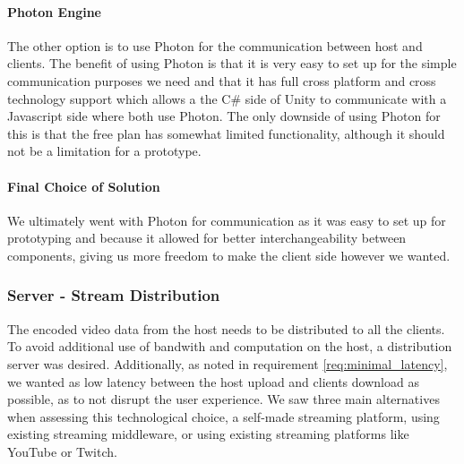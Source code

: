 \paragraph{Photon Engine}
The other option is to use Photon for the communication between host and clients. The benefit of using Photon is that it is very easy to set up for the simple communication purposes we need and that it has full cross platform and cross technology support which allows a the C\# side of Unity to communicate with a Javascript side where both use Photon. The only downside of using Photon for this is that the free plan has somewhat limited functionality, although it should not be a limitation for a prototype. 

\paragraph{Final Choice of Solution}
We ultimately went with Photon for communication as it was easy to set up for prototyping and because it allowed for better interchangeability between components, giving us more freedom to make the client side however we wanted. 
    
    
    
    
    
    
    
    
    
    
    
    
    
    
    
    

\subsubsection{Server - Stream Distribution} %
The encoded video data from the host needs to be distributed to all the clients. To avoid additional use of bandwith and computation on the host, a distribution server was desired. Additionally, as noted in requirement \ref{req:minimal_latency}, we wanted as low latency between the host upload and clients download as possible, as to not disrupt the user experience. We saw three main alternatives when assessing this technological choice, a self-made streaming platform, using existing streaming middleware, or using existing streaming platforms like YouTube or Twitch.

    
